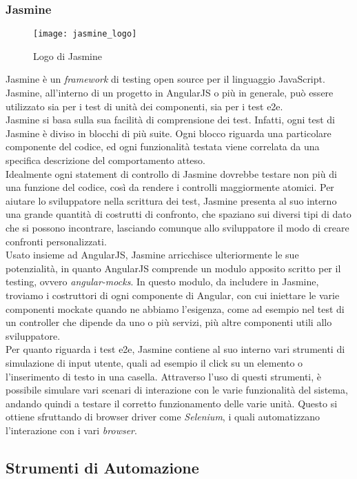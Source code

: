 \subsubsection{Jasmine}
\begin{figure}[htb] 
    \centering 
    \texttt{[image: jasmine\_logo]} 
    \caption{Logo di Jasmine}
\end{figure}
Jasmine è un \emph{framework} di testing open source per il linguaggio JavaScript. Jasmine, all’interno di un progetto in AngularJS o più in generale, può essere utilizzato sia per i test di unità dei componenti, sia per i test \gls{e2e}.\\
Jasmine si basa sulla sua facilità di comprensione dei test. Infatti, ogni test di Jasmine è diviso in blocchi di più suite. Ogni blocco riguarda una particolare componente del codice, ed ogni funzionalità testata viene correlata da una specifica descrizione del comportamento atteso.\\
Idealmente ogni statement di controllo di Jasmine dovrebbe testare non più di una funzione del codice, così da rendere i controlli maggiormente atomici. Per aiutare lo sviluppatore nella scrittura dei test, Jasmine presenta al suo interno una grande quantità di costrutti di confronto, che spaziano sui diversi tipi di dato che si possono incontrare, lasciando comunque allo sviluppatore il modo di creare confronti personalizzati.\\
Usato insieme ad AngularJS, Jasmine arricchisce ulteriormente le sue potenzialità, in quanto AngularJS comprende un modulo apposito scritto per il testing, ovvero \emph{angular-mocks}. In questo modulo, da includere in Jasmine, troviamo i costruttori di ogni componente di Angular, con cui iniettare le varie componenti mockate quando ne abbiamo l’esigenza, come ad esempio nel test di un controller che dipende da uno o più servizi, più altre componenti utili allo sviluppatore.\\
Per quanto riguarda i test \gls{e2e}, Jasmine contiene al suo interno vari strumenti di simulazione di input utente, quali ad esempio il click su un elemento o l’inserimento di testo in una casella. Attraverso l’uso di questi strumenti, è possibile simulare vari scenari di interazione con le varie funzionalità del sistema, andando quindi a testare il corretto funzionamento delle varie unità. 
Questo si ottiene sfruttando di browser driver come \emph{Selenium}, i quali automatizzano l’interazione con i vari \emph{browser}.

\subsection{Strumenti di Automazione}

